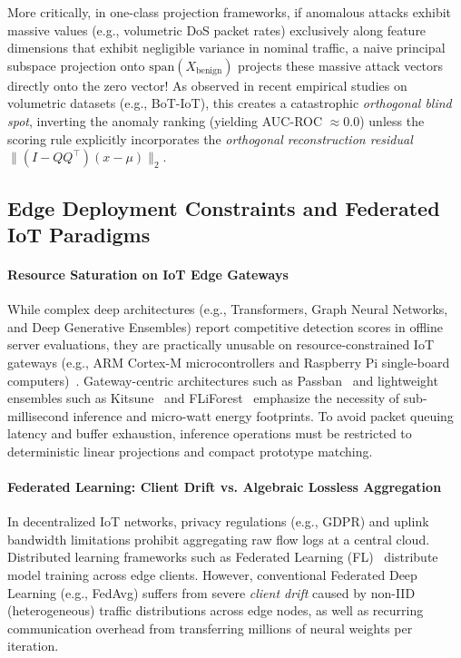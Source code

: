 More critically, in one-class projection frameworks, if anomalous attacks exhibit massive values (e.g., volumetric DoS packet rates) exclusively along feature dimensions that exhibit negligible variance in nominal traffic, a naive principal subspace projection onto $\mathrm{span}(X_{\text{benign}})$ projects these massive attack vectors directly onto the zero vector! As observed in recent empirical studies on volumetric datasets (e.g., BoT-IoT), this creates a catastrophic \emph{orthogonal blind spot}, inverting the anomaly ranking (yielding AUC-ROC $\approx 0.0$) unless the scoring rule explicitly incorporates the \emph{orthogonal reconstruction residual} $\|(I - QQ^\top)(x - \mu)\|_2$.

\subsection{Edge Deployment Constraints and Federated IoT Paradigms}
\label{subsec:rel_edge_federated}

\paragraph{Resource Saturation on IoT Edge Gateways}
While complex deep architectures (e.g., Transformers, Graph Neural Networks, and Deep Generative Ensembles) report competitive detection scores in offline server evaluations, they are practically unusable on resource-constrained IoT gateways (e.g., ARM Cortex-M microcontrollers and Raspberry Pi single-board computers)~\cite{rahman2025iot,mirsky2018kitsune}. Gateway-centric architectures such as Passban~\cite{eskandari2020passban} and lightweight ensembles such as Kitsune~\cite{mirsky2018kitsune} and FLiForest~\cite{xiang2026federated} emphasize the necessity of sub-millisecond inference and micro-watt energy footprints. To avoid packet queuing latency and buffer exhaustion, inference operations must be restricted to deterministic linear projections and compact prototype matching.

\paragraph{Federated Learning: Client Drift vs. Algebraic Lossless Aggregation}
In decentralized IoT networks, privacy regulations (e.g., GDPR) and uplink bandwidth limitations prohibit aggregating raw flow logs at a central cloud. Distributed learning frameworks such as Federated Learning (FL)~\cite{mcmahan2017communication,nguyen2019diot} distribute model training across edge clients. However, conventional Federated Deep Learning (e.g., FedAvg) suffers from severe \emph{client drift} caused by non-IID (heterogeneous) traffic distributions across edge nodes, as well as recurring communication overhead from transferring millions of neural weights per iteration. 

